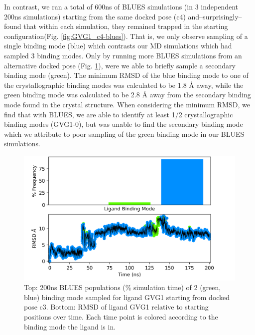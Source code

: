 In contrast, we ran a total of 600ns of BLUES simulations (in 3 independent 200ns simulations) starting from the same docked pose (c4) and--surprisingly--found that within each simulation, they remained trapped in the starting configuration(Fig. \ref{fig:GVG1_c4-blues}).
That is, we only observe sampling of a single binding mode (blue) which contrasts our MD simulations which had sampled 3 binding modes.
Only by running more BLUES simulations from an alternative docked pose (Fig. \ref{fig:GVG1_c3-blues}), were we able to briefly sample a secondary binding mode (green).
The minimum RMSD of the blue binding mode to one of the crystallographic binding modes was calculated to be 1.8 {\AA} away, while the green binding mode was calculated to be 2.8 {\AA} away from the secondary binding mode found in the crystal structure.
When considering the minimum RMSD, we find that with BLUES, we are able to identify at least 1/2 crystallographic binding modes (GVG1-0), but was unable to find the secondary binding mode which we attribute to poor sampling of the green binding mode in our BLUES simulations.

\begin{figure}
    \centering
    \includegraphics[width=\linewidth]{chapter6/Figures/GVG_1_c3-14709106.png}
    \caption[GVG1 (c3) BLUES Populations]{Top: 200ns BLUES populations (\% simulation time) of 2 (green, blue) binding mode sampled for ligand GVG1 starting from docked pose c3. Bottom: RMSD of ligand GVG1 relative to starting positions over time. Each time point is colored according to the binding mode the ligand is in.}
    \label{fig:GVG1_c3-blues}
\end{figure}

